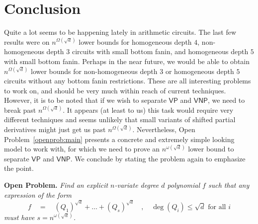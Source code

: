 \documentclass[12pt]{report}
\newcommand{\VP}{\mathsf{VP}}
\newcommand{\VNP}{\mathsf{VNP}}
\begin{document}
\section{Conclusion}\label{sec:conc}

Quite a lot seems to be happening lately in arithmetic circuits. The last few results were on $n^{\Omega(\sqrt{d})}$ lower bounds for homogeneous depth $4$, non-homogeneous depth $3$ circuits with small bottom fanin, and homogeneous depth $5$ with small bottom fanin. Perhaps in the near future, we would be able to obtain $n^{\Omega(\sqrt{d})}$ lower bounds for non-homogeneous depth $3$ or homogeneous depth $5$ circuits without any bottom fanin restrictions. These are all interesting problems to work on, and should be very much within reach of current techniques. However, it is to be noted that if we wish to separate $\VP$ and $\VNP$, we need to break past $n^{\Omega(\sqrt{d})}$. It appears (at least to us) this task would require very different techniques and seems unlikely that small variants of shifted partial derivatives might just get us past $n^{\Omega(\sqrt{d})}$. Nevertheless, Open Problem~\ref{openprob:main} presents a concrete and extremely simple looking model to work with, for which we need to prove an $n^{\omega(\sqrt{d})}$ lower bound to separate $\VP$ and $\VNP$. We conclude by stating the problem again to emphasize the point. 

\begin{mdframed}
{\bf Open Problem. } {\em Find an explicit $n$-variate degree $d$ polynomial $f$ such that any expression of the form
\[
f \quad=\quad (Q_1)^{\sqrt{d}} + \dots + (Q_{s})^{\sqrt{d}}\quad,\quad \deg(Q_i) \leq \sqrt{d} \text{ for all $i$}
\]
must have $s = n^{\omega(\sqrt{d})}$. }
\end{mdframed}




\end{document}
